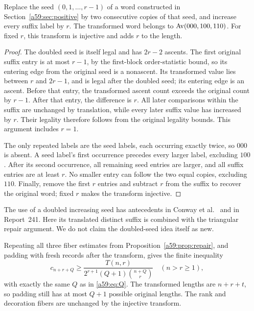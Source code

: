 \documentclass[11pt,letterpaper]{article}
\theoremstyle{remark}\newtheorem{remark}[theorem]{Remark}
\theoremstyle{remark}\newtheorem{wremark}{Remark}\renewcommand{\thewremark}{W\arabic{wremark}}
\theoremstyle{plain}\newtheorem{wcorollary}[wremark]{Corollary}
\begin{document}
\begin{lemma}\label{a59:lem:doubling}
Replace the seed $(0,1,\ldots,r-1)$ of a word constructed in Section~\ref{a59:sec:positive} by two consecutive copies of that seed, and increase every suffix label by $r$. The transformed word belongs to $\operatorname{Av}(000,100,110)$. For fixed $r$, this transform is injective and adds $r$ to the length.
\end{lemma}
\begin{proof}
The doubled seed is itself legal and has $2r-2$ ascents. The first original suffix entry is at most $r-1$, by the first-block order-statistic bound, so its entering edge from the original seed is a nonascent. Its transformed value lies between $r$ and $2r-1$, and is legal after the doubled seed; its entering edge is an ascent. Before that entry, the transformed ascent count exceeds the original count by $r-1$. After that entry, the difference is $r$. All later comparisons within the suffix are unchanged by translation, while every later suffix value has increased by $r$. Their legality therefore follows from the original legality bounds. This argument includes $r=1$.

The only repeated labels are the seed labels, each occurring exactly twice, so $000$ is absent. A seed label's first occurrence precedes every larger label, excluding $100$. After its second occurrence, all remaining seed entries are larger, and all suffix entries are at least $r$. No smaller entry can follow the two equal copies, excluding $110$. Finally, remove the first $r$ entries and subtract $r$ from the suffix to recover the original word; fixed $r$ makes the transform injective.
\end{proof}
The use of a doubled increasing seed has antecedents in Conway et al.\ \cite[Section~7]{conway} and in Report~241. Here its translated distinct suffix is combined with the triangular repair argument. We do not claim the doubled-seed idea itself as new.

Repeating all three fiber estimates from Proposition~\ref{a59:prop:repair}, and padding with fresh records after the transform, gives the finite inequality
\begin{equation}\label{a59:eq:commonfinite}
 c_{n+r+Q}\ge
 \frac{T(n,r)}{2^{r+1}(Q+1)\binom{n+Q}{r}}
 \quad(n>r\ge1),
\end{equation}
with exactly the same $Q$ as in \eqref{a59:eq:Q}. The transformed lengths are $n+r+t$, so padding still has at most $Q+1$ possible original lengths. The rank and decoration fibers are unchanged by the injective transform.
\end{document}
